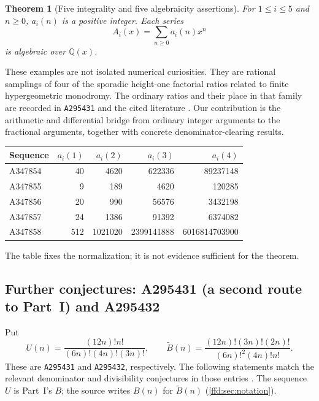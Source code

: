 \documentclass[11pt]{article}
\newtheorem{theorem}{Theorem}[section]
\theoremstyle{definition}
\theoremstyle{remark}
\newcommand{\Q}{\mathbb Q}
\newcommand{\OEIS}[1]{\texttt{#1}}
\newcommand{\tB}{\widetilde B}
\begin{document}
\begin{theorem}[Five integrality and five algebraicity assertions]\label{ffd:thm:main}
For $1\le i\le5$ and $n\ge0$, $a_i(n)$ is a positive integer. Each series
\[
 A_i(x)=\sum_{n\ge0}a_i(n)x^n
\]
is algebraic over $\Q(x)$.
\end{theorem}

These examples are not isolated numerical curiosities. They are rational
samplings of four of the sporadic height-one factorial ratios related to
finite hypergeometric monodromy. The ordinary ratios and their place in that
family are recorded in \OEIS{A295431} and the cited literature
\cite{ffd-oeis431,bober,ffd-rv}. Our contribution is the arithmetic and differential
bridge from ordinary integer arguments to the fractional arguments, together
with concrete denominator-clearing results.

\begin{center}
\small
\begin{tabular}{lrrrr}
\toprule
Sequence & $a_i(1)$ & $a_i(2)$ & $a_i(3)$ & $a_i(4)$\\
\midrule
A347854 &40&4620&622336&89237148\\
A347855 &9&189&4620&120285\\
A347856 &20&990&56576&3432198\\
A347857 &24&1386&91392&6374082\\
A347858 &512&1021020&2399141888&6016814703900\\
\bottomrule
\end{tabular}
\end{center}
The table fixes the normalization; it is not evidence sufficient for the theorem.

\subsection{Further conjectures: A295431 (a second route to Part~I) and A295432}\label{ffd:sec:further-conj}
Put
\begin{equation}
 U(n)=\frac{(12n)!n!}{(6n)!(4n)!(3n)!},\qquad
 \tB(n)=\frac{(12n)!(3n)!(2n)!}{(6n)!^2(4n)!n!}.
 \label{ffd:eq:UB}
\end{equation}
These are \OEIS{A295431} and \OEIS{A295432}, respectively.
The following statements match the relevant denominator and divisibility
conjectures in those entries \cite{ffd-oeis431,ffd-oeis432}.
The sequence $U$ is Part~I's $B$; the source writes $B(n)$ for $\tB(n)$
(\cref{ffd:sec:notation}).
\end{document}
